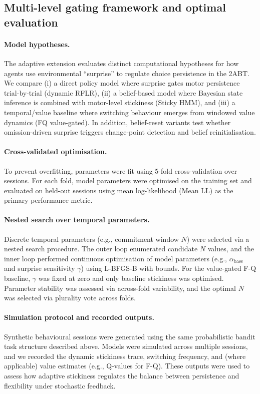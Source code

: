 \documentclass[11pt, reprint, aps, prl]{revtex4-2}
\begin{document}
\subsection{Multi-level gating framework and optimal evaluation}
\paragraph{Model hypotheses.}
The adaptive extension evaluates distinct computational hypotheses for how agents use environmental ``surprise'' to regulate choice persistence in the 2ABT. We compare (i) a direct policy model where surprise gates motor persistence trial-by-trial (dynamic RFLR), (ii) a belief-based model where Bayesian state inference is combined with motor-level stickiness (Sticky HMM), and (iii) a temporal/value baseline where switching behaviour emerges from windowed value dynamics (FQ value-gated). In addition, belief-reset variants test whether omission-driven surprise triggers change-point detection and belief reinitialisation.
\paragraph{Cross-validated optimisation.}
To prevent overfitting, parameters were fit using 5-fold cross-validation over sessions. For each fold, model parameters were optimised on the training set and evaluated on held-out sessions using mean log-likelihood (Mean LL) as the primary performance metric.
\paragraph{Nested search over temporal parameters.}
Discrete temporal parameters (e.g., commitment window $N$) were selected via a nested search procedure. The outer loop enumerated candidate $N$ values, and the inner loop performed continuous optimisation of model parameters (e.g., $\alpha_{\mathrm{base}}$ and surprise sensitivity $\gamma$) using L-BFGS-B with bounds. For the value-gated F-Q baseline, $\gamma$ was fixed at zero and only baseline stickiness was optimised. Parameter stability was assessed via across-fold variability, and the optimal $N$ was selected via plurality vote across folds.

\paragraph{\textbf{Simulation protocol and recorded outputs.}}
Synthetic behavioural sessions were generated using the same probabilistic bandit task structure described above. Models were simulated across multiple sessions, and we recorded the dynamic stickiness trace, switching frequency, and (where applicable) value estimates (e.g., Q-values for F-Q). These outputs were used to assess how adaptive stickiness regulates the balance between persistence and flexibility under stochastic feedback.
\end{document}
